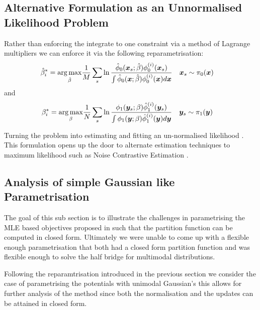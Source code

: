 \documentclass[a4paper,12pt,twoside,openright]{report}
\theoremstyle{definition}
\begin{document}
\subsection{Alternative Formulation as an Unnormalised Likelihood Problem}

Rather than enforcing the integrate to one constraint via a method of Lagrange multipliers we can enforce it via the following reparametrisation:
\begin{align}
    \hat{\beta}^*_i = \operatorname*{arg\,max}_{\hat{\beta} } &\frac{1}{M} \sum_s \operatorname{ln} \frac{{\hat{\phi}}_0({\bm{x}}_s; \hat{\beta} )   \phi_0^{(i)}({\bm{x}}_s)}{ \int {\hat{\phi}}_0({\bm{x}}; \hat{\beta} )   \phi_0^{(i)}({\bm{x}}) d{\bm{x}}}
    \quad {\bm{x}}_s\sim \pi_0({\bm{x}}) \nonumber 
\end{align}
and
\begin{align}
    {\beta}^*_i = \operatorname*{arg\,max}_{{\beta} } &\frac{1}{N} \sum_s \operatorname{ln}\frac{ \phi_1({\bm{y}}_s; {\beta} )   {\hat{\phi}}_1^{(i)}({\bm{y}}_s)}{ \int \phi_1({\bm{y}}; {\beta} )   {\hat{\phi}}_1^{(i)}({\bm{y}}) d{\bm{y}} }
    \quad {\bm{y}}_s\sim \pi_1({\bm{y}}) \nonumber 
\end{align}

Turning the problem into estimating and fitting an un-normalised likelihood \cite{gutmann2010noise}. This formulation opens up the door to alternate estimation techniques to maximum likelihood such as Noise Contrastive Estimation \cite{gutmann2010noise}.

\subsection{Analysis of simple Gaussian like Parametrisation}

The goal of this sub section is to illustrate the challenges in parametrising the MLE based objectives proposed in \cite{pavon2018data} such that the partition function can be computed in closed form. Ultimately we were unable to come up with a flexible enough parametrisation that both had a closed form partition function and was flexible enough to solve the half bridge for multimodal distributions.

Following the reparamtrisation introduced in the previous section we consider the case of parametrising the potentials with unimodal Gaussian's this allows for further analysis of the method since both the normalisation and the updates can be attained in closed form. 
\end{document}
